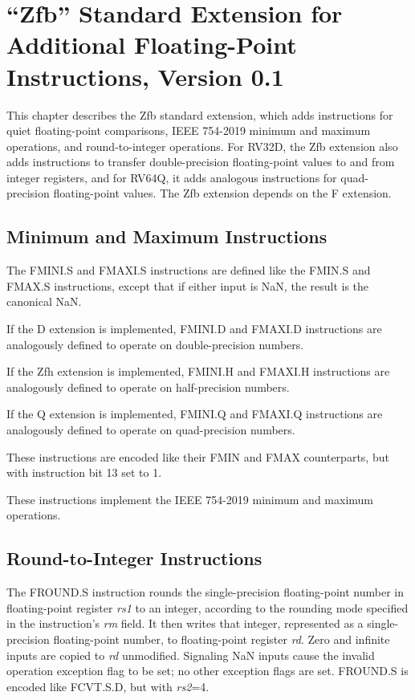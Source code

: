 \chapter{``Zfb'' Standard Extension for Additional Floating-Point
Instructions, Version 0.1}
\label{chap:zfb}

This chapter describes the Zfb standard extension, which adds instructions for
quiet floating-point comparisons, IEEE 754-2019 minimum and maximum
operations, and round-to-integer operations.
For RV32D, the Zfb extension also adds instructions to transfer
double-precision floating-point values to and from integer registers, and for
RV64Q, it adds analogous instructions for quad-precision floating-point
values.
The Zfb extension depends on the F extension.

\section{Minimum and Maximum Instructions}

The FMINI.S and FMAXI.S instructions are defined like the FMIN.S and FMAX.S
instructions, except that if either input is NaN, the result is the
canonical NaN.

If the D extension is implemented, FMINI.D and FMAXI.D instructions are
analogously defined to operate on double-precision numbers.

If the Zfh extension is implemented, FMINI.H and FMAXI.H instructions are
analogously defined to operate on half-precision numbers.

If the Q extension is implemented, FMINI.Q and FMAXI.Q instructions are
analogously defined to operate on quad-precision numbers.

These instructions are encoded like their FMIN and FMAX counterparts, but
with instruction bit 13 set to 1.

\begin{commentary}
These instructions implement the IEEE 754-2019 minimum and maximum operations.
\end{commentary}


\section{Round-to-Integer Instructions}

The FROUND.S instruction rounds the single-precision floating-point number in
floating-point register {\em rs1} to an integer, according to the rounding
mode specified in the instruction's {\em rm} field.
It then writes that integer, represented as a single-precision floating-point
number, to floating-point register {\em rd}.
Zero and infinite inputs are copied to {\em rd} unmodified.
Signaling NaN inputs cause the invalid operation exception flag to be set; no
other exception flags are set.
FROUND.S is encoded like FCVT.S.D, but with {\em rs2}=4.

